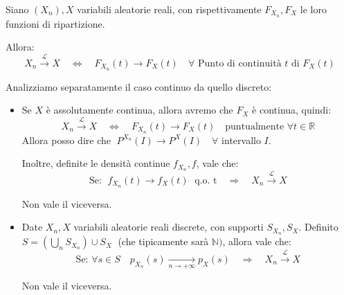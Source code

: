 \begin{teorema}
\label{th:15.23}
    Siano $(X_n), X$ variabili aleatorie reali, con rispettivamente $F_{X_n}, F_X$ le loro funzioni di ripartizione. 
    
    \medskip Allora:
    \[X_n \overset{\mathcal{L}}{\longrightarrow}X \quad \iff \quad F_{X_n}(t)\longrightarrow F_X(t) \quad \forall \text{ Punto di continuità $t$ di } F_X(t)\]
\end{teorema}

\noindent Analizziamo separatamente il caso continuo da quello discreto:
\begin{itemize}
    \item Se $X$ è assolutamente continua, allora avremo che $F_X$ è continua, quindi:
    \[X_n \overset{\mathcal{L}}{\longrightarrow}X \quad \iff \quad F_{X_n}(t)\longrightarrow F_X(t) \quad \text{puntualmente } \forall t\in\mathbb{R}\]
    \noindent Allora posso dire che $\;P^{X_n}(I) \longrightarrow P^X(I)\quad \forall$ intervallo $I$.
    
    \medskip
    Inoltre, definite le densità continue $f_{X_n}, f$, vale che: 
    \[\boxed{\text{Se: }\; f_{X_n}(t)\longrightarrow f_X(t) \;\text{ q.o. t}\quad \Rightarrow\quad X_n \overset{\mathcal{L}}{\longrightarrow}X}\]

    \medskip
    \noindent Non vale il viceversa.

    \item Date $X_n, X$ variabili aleatorie reali discrete, con supporti $S_{X_n}, S_X$. Definito $S = \left(\bigcup_n S_{X_n}\right)\cup S_X\;$ (che tipicamente sarà $\mathbb N)$, allora vale che:\\
    \[\boxed{\text{Se: }\forall s \in S\quad p_{X_n}(s) \underset{n\to+\infty}{\longrightarrow}p_X(s) \quad \Rightarrow \quad X_n \overset{\mathcal{L}}{\longrightarrow}X}\]

    \medskip
    \noindent Non vale il viceversa.
\end{itemize} 

